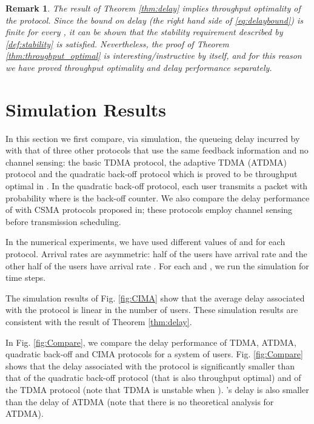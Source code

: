 \documentclass[onecolumn,draftcls]{IEEEtran}
\newtheorem{remark}{Remark}
\begin{document}
\begin{remark}
The result of Theorem \ref{thm:delay} implies throughput optimality of the  protocol.
Since the bound on delay (the right hand side of \eqref{eq:delaybound}) is finite for every , it can be shown that the stability requirement described by \eqref{def:stability} is satisfied. Nevertheless, the proof of Theorem \ref{thm:throughput_optimal} is interesting/instructive by itself, and for this reason we have proved throughput optimality and delay performance separately.
\end{remark}

\section{Simulation Results}
\label{sec:simulation}

In this section we first compare, via simulation, the queueing delay incurred by  with 
that of three other protocols that use the same feedback information and no channel sensing: the basic TDMA protocol, the adaptive TDMA (ATDMA) protocol \cite{papadimitriou2003adaptive} and the quadratic back-off protocol which is proved to be throughput optimal in \cite{haastad1996analysis}. 
In the quadratic back-off protocol, each user transmits a packet with probability  where  is the back-off counter.
We also compare the delay performance of  with CSMA protocols proposed in\cite{chlebus2012adversarial,anantharamu2009adversarial}; these protocols employ channel sensing before transmission scheduling.

In the numerical experiments, we have used different values of  and  for each protocol.
Arrival rates are asymmetric: half of the users have arrival rate  and the other half of the users have arrival rate .
For each  and , we run the simulation for  time steps. 



The simulation results of Fig. \ref{fig:CIMA} show that the average delay associated with the  protocol is linear in the number of users. These simulation results are consistent with the result of Theorem \ref{thm:delay}.

In Fig. \ref{fig:Compare}, we compare the delay performance of TDMA, ATDMA, quadratic back-off and CIMA protocols for a system of  users.
Fig. \ref{fig:Compare} shows that the delay associated with the  protocol is significantly smaller than that of the quadratic back-off protocol (that is also throughput optimal) and of the TDMA protocol (note that TDMA is unstable when  ). 's delay is also smaller than the delay of ATDMA (note that there is no theoretical analysis for ATDMA).
\end{document}
